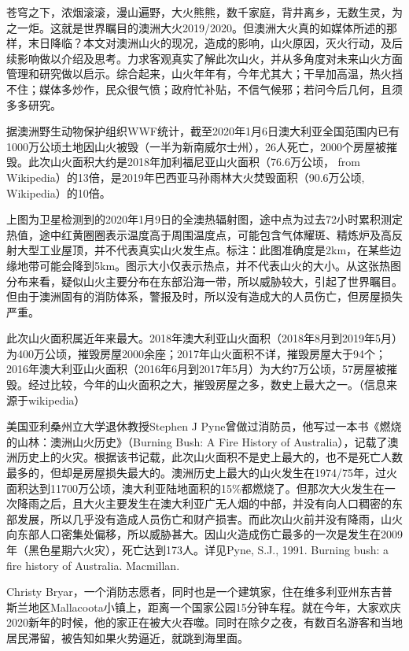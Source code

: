\documentclass[
]{book}
\begin{document}
苍穹之下，浓烟滚滚，漫山遍野，大火熊熊，数千家庭，背井离乡，无数生灵，为之一炬。这就是世界瞩目的澳洲大火2019/2020。但澳洲大火真的如媒体所述的那样，末日降临？本文对澳洲山火的现况，造成的影响，山火原因，灭火行动，及后续影响做以介绍及思考。力求客观真实了解此次山火，并从多角度对未来山火方面管理和研究做以启示。综合起来，山火年年有，今年尤其大；干旱加高温，热火挡不住；媒体多炒作，民众很气愤；政府忙补贴，不信气候邪；若问今后几何，且须多多研究。

据澳洲野生动物保护组织WWF统计，截至2020年1月6日澳大利亚全国范围内已有1000万公顷土地因山火被毁（一半为新南威尔士州），26人死亡，2000个房屋被摧毁。此次山火面积大约是2018年加利福尼亚山火面积（76.6万公顷， from Wikipedia）的13倍，是2019年巴西亚马孙雨林大火焚毁面积（90.6万公顷, Wikipedia）的10倍。

上图为卫星检测到的2020年1月9日的全澳热辐射图，途中点为过去72小时累积测定热值，途中红黄圈圈表示温度高于周围温度点，可能包含气体耀斑、精炼炉及高反射大型工业屋顶，并不代表真实山火发生点。标注：此图准确度是2km，在某些边缘地带可能会降到5km。图示大小仅表示热点，并不代表山火的大小。从这张热图分布来看，疑似山火主要分布在东部沿海一带，所以威胁较大，引起了世界瞩目。但由于澳洲固有的消防体系，警报及时，所以没有造成大的人员伤亡，但房屋损失严重。

此次山火面积属近年来最大。2018年澳大利亚山火面积（2018年8月到2019年5月）为400万公顷，摧毁房屋2000余座；2017年山火面积不详，摧毁房屋大于94个；2016年澳大利亚山火面积（2016年6月到2017年5月）为大约7万公顷，57房屋被摧毁。经过比较，今年的山火面积之大，摧毁房屋之多，数史上最大之一。（信息来源于wikipedia）

美国亚利桑州立大学退休教授Stephen J Pyne曾做过消防员，他写过一本书《燃烧的山林：澳洲山火历史》（Burning Bush: A Fire History of Australia），记载了澳洲历史上的火灾。根据该书记载，此次山火面积不是史上最大的，也不是死亡人数最多的，但却是房屋损失最大的。澳洲历史上最大的山火发生在1974/75年，过火面积达到11700万公顷，澳大利亚陆地面积的15\%都燃烧了。但那次大火发生在一次降雨之后，且大火主要发生在澳大利亚广无人烟的中部，并没有向人口稠密的东部发展，所以几乎没有造成人员伤亡和财产损害。而此次山火前并没有降雨，山火向东部人口密集处偏移，所以威胁甚大。因山火造成伤亡最多的一次是发生在2009年（黑色星期六火灾），死亡达到173人。详见Pyne, S.J., 1991. Burning bush: a fire history of Australia. Macmillan.

Christy Bryar，一个消防志愿者，同时也是一个建筑家，住在维多利亚州东吉普斯兰地区Mallacoota小镇上，距离一个国家公园15分钟车程。就在今年，大家欢庆2020新年的时候，他的家正在被大火吞噬。同时在除夕之夜，有数百名游客和当地居民滞留，被告知如果火势逼近，就跳到海里面。
\end{document}
